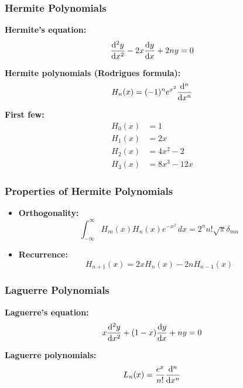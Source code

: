 \documentclass[12pt,a4paper]{article}
\begin{document}
\subsubsection{Hermite Polynomials}
\begin{formulabox}
\textbf{Hermite's equation:}
\begin{equation}
\dv[2]{y}{x} - 2x\dv{y}{x} + 2ny = 0
\end{equation}

\textbf{Hermite polynomials (Rodrigues formula):}
\begin{equation}
H_n(x) = (-1)^n e^{x^2} \dv[n]{}{x}(e^{-x^2})
\end{equation}

\textbf{First few:}
\begin{align}
H_0(x) &= 1 \\
H_1(x) &= 2x \\
H_2(x) &= 4x^2 - 2 \\
H_3(x) &= 8x^3 - 12x
\end{align}
\end{formulabox}

\subsubsection{Properties of Hermite Polynomials}
\begin{itemize}
    \item \textbf{Orthogonality:}
    \begin{equation}
    \int_{-\infty}^{\infty} H_m(x) H_n(x) e^{-x^2} \, dx = 2^n n!\sqrt{\pi}\delta_{mn}
    \end{equation}
    \item \textbf{Recurrence:}
    \begin{equation}
    H_{n+1}(x) = 2xH_n(x) - 2nH_{n-1}(x)
    \end{equation}
\end{itemize}

\subsubsection{Laguerre Polynomials}
\begin{formulabox}
\textbf{Laguerre's equation:}
\begin{equation}
x\dv[2]{y}{x} + (1-x)\dv{y}{x} + ny = 0
\end{equation}

\textbf{Laguerre polynomials:}
\begin{equation}
L_n(x) = \frac{e^x}{n!}\dv[n]{}{x}(x^n e^{-x})
\end{equation}
\end{formulabox}
\end{document}
